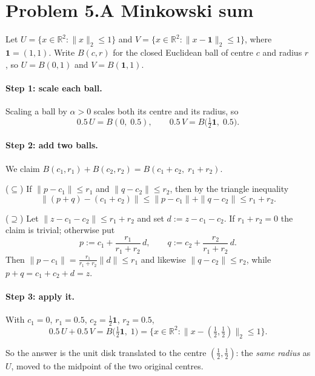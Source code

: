 \documentclass[11pt]{article}
\theoremstyle{definition}
\theoremstyle{plain}
\begin{document}
\section*{Problem 5.\quad A Minkowski sum \quad[5 pts]}

Let $U = \{x \in \mathbb{R}^2 : \|x\|_2 \le 1\}$ and
$V = \{x \in \mathbb{R}^2 : \|x - \mathbf{1}\|_2 \le 1\}$, where
$\mathbf{1} = (1,1)$. Write $B(c, r)$ for the closed Euclidean ball of
centre $c$ and radius $r$, so $U = B(0,1)$ and $V = B(\mathbf{1}, 1)$.

\paragraph{Step 1: scale each ball.} Scaling a ball by
$\alpha > 0$ scales both its centre and its radius, so
\[
  0.5\,U = B(0,\; 0.5),
  \qquad
  0.5\,V = B\big(\tfrac12 \mathbf{1},\; 0.5\big).
\]

\paragraph{Step 2: add two balls.} We claim
$B(c_1,r_1) + B(c_2,r_2) = B(c_1+c_2,\; r_1+r_2)$.

($\subseteq$) If $\|p - c_1\| \le r_1$ and $\|q - c_2\| \le r_2$, then by
the triangle inequality
\[
  \|(p+q) - (c_1+c_2)\| \le \|p - c_1\| + \|q - c_2\|
  \le r_1 + r_2 .
\]

($\supseteq$) Let $\|z - c_1 - c_2\| \le r_1 + r_2$ and set
$d := z - c_1 - c_2$. If $r_1 + r_2 = 0$ the claim is trivial;
otherwise put
\[
  p := c_1 + \frac{r_1}{r_1+r_2}\,d,
  \qquad
  q := c_2 + \frac{r_2}{r_1+r_2}\,d .
\]
Then $\|p - c_1\| = \frac{r_1}{r_1+r_2}\|d\| \le r_1$ and likewise
$\|q - c_2\| \le r_2$, while $p + q = c_1 + c_2 + d = z$.

\paragraph{Step 3: apply it.} With
$c_1 = 0$, $r_1 = 0.5$, $c_2 = \tfrac12\mathbf{1}$, $r_2 = 0.5$,
\[
  \boxed{\;
  0.5\,U + 0.5\,V
  = B\big( \tfrac12 \mathbf{1}, \; 1 \big)
  = \Big\{ x \in \mathbb{R}^2 :
      \big\| x - (\tfrac12, \tfrac12) \big\|_2 \le 1 \Big\}. \;}
\]

So the answer is the unit disk translated to the centre
$(\tfrac12, \tfrac12)$: the \emph{same radius} as $U$, moved to the
midpoint of the two original centres.
\end{document}
